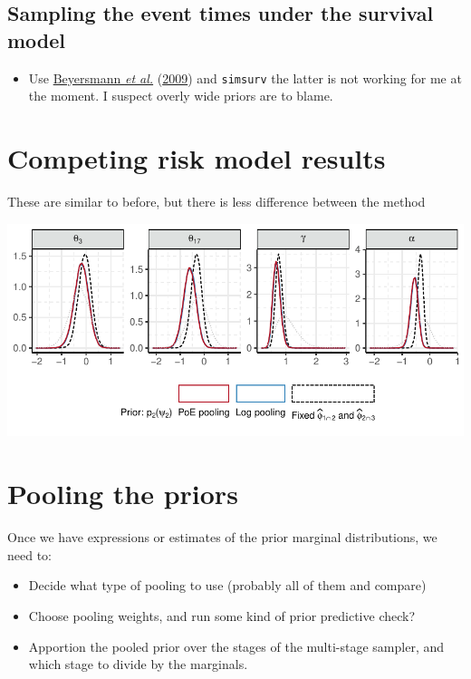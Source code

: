 \documentclass[
  10pt,
  a4paper,
]{article}
\providecommand{\tightlist}{%
  \setlength{\itemsep}{0pt}\setlength{\parskip}{0pt}}
\begin{document}
\hypertarget{sampling-the-event-times-under-the-survival-model}{%
\subsection{Sampling the event times under the survival
model}\label{sampling-the-event-times-under-the-survival-model}}

\begin{itemize}
\tightlist
\item
  Use \protect\hyperlink{ref-beyersmann_simulating_2009}{Beyersmann
  \emph{et al.}}
  (\protect\hyperlink{ref-beyersmann_simulating_2009}{2009}) and
  \texttt{simsurv} the latter is not working for me at the moment. I
  suspect overly wide priors are to blame.
\end{itemize}

\hypertarget{competing-risk-model-results}{%
\section{Competing risk model
results}\label{competing-risk-model-results}}

These are similar to before, but there is less difference between the
method

\begin{center}\includegraphics{../plots/mimic-example/psi-2-method-comparison-small} \end{center}

\hypertarget{pooling-the-priors}{%
\section{Pooling the priors}\label{pooling-the-priors}}

Once we have expressions or estimates of the prior marginal
distributions, we need to:

\begin{itemize}
\tightlist
\item
  Decide what type of pooling to use (probably all of them and compare)
\item
  Choose pooling weights, and run some kind of prior predictive check?
\item
  Apportion the pooled prior over the stages of the multi-stage sampler,
  and which stage to divide by the marginals.
\end{itemize}
\end{document}
